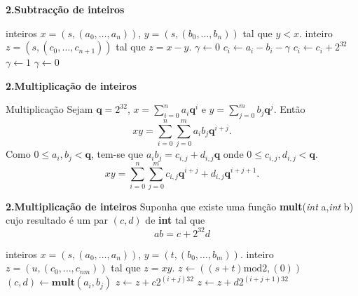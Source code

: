 \documentclass{beamer}
\newcommand{\q}{\mathbf{q}}
\begin{document}
\begin{frame}[fragile]{\bf 2.}{\bf Subtracção de inteiros}
\begin{algorithmic}
\REQUIRE inteiros $x=(s,(a_0,\ldots, a_n))$, $y=(s,(b_0,\ldots, b_n))$ tal que $y<x$.
\ENSURE inteiro $z=(s, (c_0, \ldots, c_{n+1}))$ tal que $z=x-y$.
\STATE $\gamma \leftarrow 0$ 
  \STATE $c_i \leftarrow a_i-b_i-\gamma$
        \STATE $c_i \leftarrow c_i + 2^{32}$
        \STATE $\gamma \leftarrow 1$
  \ELSE
	\STATE $\gamma \leftarrow 0$
  \ENDIF
\ENDFOR
\end{algorithmic}

\end{frame}




\begin{frame}{\bf 2.}{\bf Multiplicação de inteiros}
\begin{block}{Multiplicação} Sejam $\q=2^{32}$, $x=\sum_{i=0}^n a_i\q^i$ e $y=\sum_{j=0}^m b_j\q^j$. Então
$$ xy = \sum_{i=0}^n \sum_{j=0}^m a_ib_j \q^{i+j}.$$
Como $0\leq a_i, b_j < \q$, tem-se que $a_ib_j = c_{i,j} + d_{i,j}\q$ onde $0\leq c_{i,j}, d_{i,j} < \q$.
$$ xy = \sum_{i=0}^n \sum_{j=0}^m c_{i,j} \q^{i+j} + d_{i,j}\q^{i+j+1}.$$
\end{block}
\end{frame}


\begin{frame}[fragile]{\bf 2.}{\bf Multiplicação de inteiros}
Suponha que existe uma função {\bf mult}({\it int} a,{\it int} b) cujo resultado é um par $(c,d)$ de {\bf int} tal que 
$$ab = c + 2^{32}d$$

\begin{algorithmic}
\REQUIRE inteiros $x=(s,(a_0,\ldots, a_n))$, $y=(t,(b_0,\ldots, b_m))$.
\ENSURE inteiro $z=(u, (c_0, \ldots, c_{nm}))$ tal que $z=xy$.
\STATE $z \leftarrow ( (s+t)\mathrm{mod} 2, (0))$ 
  \STATE $(c,d)\leftarrow {\mathbf{mult}}(a_i,b_j)$
  \STATE $z \leftarrow z + c 2^{(i+j)32}$
  \STATE $z \leftarrow z + d 2^{(i+j+1)32}$
 \ENDFOR
\ENDFOR
\end{algorithmic}

\end{frame}
\end{document}
